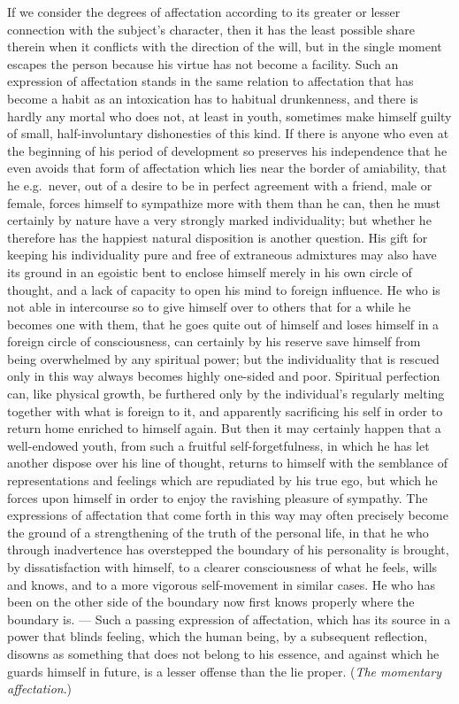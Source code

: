 \documentclass[12pt,a4paper,openany]{book}
\newcommand{\opage}[1]{\marginnote{\footnotesize\textit{[#1]}}}
\begin{document}
If we consider the degrees of affectation according to its greater or lesser
connection with the subject's character, then it has the least possible share therein
when it conflicts with the direction of the will, but in the single moment escapes the
person because his virtue has not become a facility. Such an expression of affectation
stands in the same relation to affectation that has become a habit as an intoxication
has to habitual drunkenness, and
\setcounter{footnote}{0}%
\opage{158}there is hardly any mortal who does not, at least in youth, sometimes make himself
guilty of small, half-involuntary dishonesties of this kind. If there is anyone who
even at the beginning of his period of development so preserves his independence that
he even avoids that form of affectation which lies near the border of amiability,
that he e.g.\ never, out of a desire to be in perfect agreement with a friend, male
or female, forces himself to sympathize more with them than he can, then he must
certainly by nature have a very strongly marked individuality; but whether he
therefore has the happiest natural disposition is another question. His gift for
keeping his individuality pure and free of extraneous admixtures may also have its
ground in an egoistic bent to enclose himself merely in his own circle of thought,
and a lack of capacity to open his mind to foreign influence. He who is not able in
intercourse so to give himself over to others that for a while he becomes one with
them, that he goes quite out of himself and loses himself in a foreign circle of
consciousness, can certainly by his reserve save himself from being overwhelmed by
any spiritual power; but the individuality that is rescued only in this way always
becomes highly one-sided and poor. Spiritual perfection can, like physical growth, be
furthered only by the individual's regularly melting together with what is foreign to
it, and apparently sacrificing his self in order to return home enriched to himself
again. But then it may certainly happen that a well-endowed youth, from such a
fruitful self-forgetfulness, in which he has let another dispose over his line of
thought, returns to himself with the semblance of representations and feelings which
are repudiated by his true ego, but which he forces upon himself in order to enjoy
the ravishing pleasure of sympathy. The expressions of affectation that come forth in
this way may often precisely become the ground of a strengthening of the truth of the
personal life, in that he who through inadvertence has overstepped the boundary of his
personality is brought, by dissatisfaction with himself, to a clearer
\setcounter{footnote}{0}%
\opage{159}consciousness of what he feels, wills and knows, and to a more vigorous
self-movement in similar cases. He who has been on the other side of the boundary now
first knows properly where the boundary is. --- Such a passing expression of
affectation, which has its source in a power that blinds feeling, which the human
being, by a subsequent reflection, disowns as something that does not belong to his
essence, and against which he guards himself in future, is a lesser offense than the
lie proper. (\emph{The momentary affectation}.)
\end{document}
